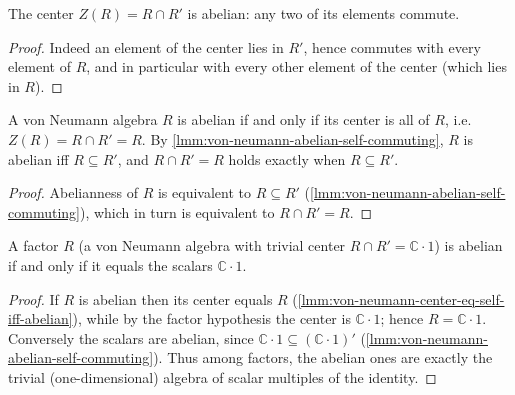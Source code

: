 \begin{theorem}
    \label{thrm:von-neumann-center-abelian}
    \leanok
    The center $Z(R) = R \cap R'$ is abelian: any two of its elements commute.
\end{theorem}
\begin{proof}
    \leanok
    Indeed an element of the center lies in $R'$, hence commutes with every element of $R$, and in particular with every other element of the center (which lies in $R$).
\end{proof}

\begin{lemma}
    \label{lmm:von-neumann-center-eq-self-iff-abelian}
    \leanok
    A von Neumann algebra $R$ is abelian if and only if its center is all of $R$, i.e. $Z(R) = R \cap R' = R$. By \ref{lmm:von-neumann-abelian-self-commuting}, $R$ is abelian iff $R \subseteq R'$, and $R \cap R' = R$ holds exactly when $R \subseteq R'$.
\end{lemma}
\begin{proof}
    \leanok
    Abelianness of $R$ is equivalent to $R \subseteq R'$ (\ref{lmm:von-neumann-abelian-self-commuting}), which in turn is equivalent to $R \cap R' = R$.
\end{proof}

\begin{theorem}
    \label{thrm:factor-abelian-iff-scalars}
    \leanok
    A factor $R$ (a von Neumann algebra with trivial center $R \cap R' = \mathbb{C}\cdot 1$) is abelian if and only if it equals the scalars $\mathbb{C}\cdot 1$.
\end{theorem}
\begin{proof}
    \leanok
    If $R$ is abelian then its center equals $R$ (\ref{lmm:von-neumann-center-eq-self-iff-abelian}), while by the factor hypothesis the center is $\mathbb{C}\cdot 1$; hence $R = \mathbb{C}\cdot 1$. Conversely the scalars are abelian, since $\mathbb{C}\cdot 1 \subseteq (\mathbb{C}\cdot 1)'$ (\ref{lmm:von-neumann-abelian-self-commuting}). Thus among factors, the abelian ones are exactly the trivial (one-dimensional) algebra of scalar multiples of the identity.
\end{proof}

